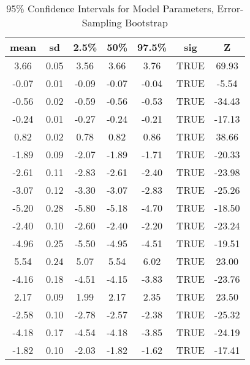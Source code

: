 \begin{table}[H]
\centering
\begin{tabular}{|c|c|c|c|c|c|c|}
  \hline
\textbf{mean} & \textbf{sd} & \textbf{2.5\%} & \textbf{50\%} & \textbf{97.5\%} & \textbf{sig} & \textbf{Z} \\ 
  \hline
3.66 & 0.05 & 3.56 & 3.66 & 3.76 & TRUE & 69.93 \\ 
  -0.07 & 0.01 & -0.09 & -0.07 & -0.04 & TRUE & -5.54 \\ 
  -0.56 & 0.02 & -0.59 & -0.56 & -0.53 & TRUE & -34.43 \\ 
  -0.24 & 0.01 & -0.27 & -0.24 & -0.21 & TRUE & -17.13 \\ 
  0.82 & 0.02 & 0.78 & 0.82 & 0.86 & TRUE & 38.66 \\ 
  -1.89 & 0.09 & -2.07 & -1.89 & -1.71 & TRUE & -20.33 \\ 
  -2.61 & 0.11 & -2.83 & -2.61 & -2.40 & TRUE & -23.98 \\ 
  -3.07 & 0.12 & -3.30 & -3.07 & -2.83 & TRUE & -25.26 \\ 
  -5.20 & 0.28 & -5.80 & -5.18 & -4.70 & TRUE & -18.50 \\ 
  -2.40 & 0.10 & -2.60 & -2.40 & -2.20 & TRUE & -23.24 \\ 
  -4.96 & 0.25 & -5.50 & -4.95 & -4.51 & TRUE & -19.51 \\ 
  5.54 & 0.24 & 5.07 & 5.54 & 6.02 & TRUE & 23.00 \\ 
  -4.16 & 0.18 & -4.51 & -4.15 & -3.83 & TRUE & -23.76 \\ 
  2.17 & 0.09 & 1.99 & 2.17 & 2.35 & TRUE & 23.50 \\ 
  -2.58 & 0.10 & -2.78 & -2.57 & -2.38 & TRUE & -25.32 \\ 
  -4.18 & 0.17 & -4.54 & -4.18 & -3.85 & TRUE & -24.19 \\ 
  -1.82 & 0.10 & -2.03 & -1.82 & -1.62 & TRUE & -17.41 \\ 
   \hline
\end{tabular}
\caption{95\% Confidence Intervals for Model Parameters, Error-Sampling Bootstrap}
\end{table}
